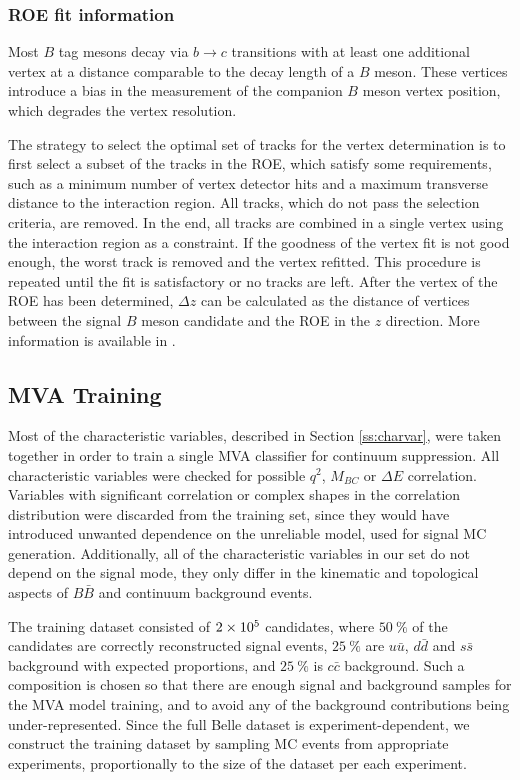 \subsubsection{ROE fit information}

Most $B$ tag mesons decay via $b \to c$ transitions with at least one additional vertex at a distance comparable to the decay length of a $B$ meson. These vertices introduce a bias in the measurement of the companion $B$ meson vertex position, which degrades the vertex resolution.

The strategy to select the optimal set of tracks for the vertex determination is to first select a subset of the tracks in the ROE, which satisfy some requirements, such as a minimum number of vertex detector hits and a maximum transverse distance to the interaction region. All tracks, which do not pass the selection criteria, are removed. In the end, all tracks are combined in a single vertex using the interaction region as a constraint. If the goodness of the vertex fit is not good enough, the worst track is removed and the vertex refitted. This procedure is repeated until the fit is satisfactory or no tracks are left. After the vertex of the ROE has been determined, $\Delta z$ can be calculated as the distance of vertices between the signal $B$ meson candidate and the ROE in the $z$ direction.
More information is available in \cite{bevan2014physics}.

\subsection{MVA Training}
\label{ss:qqmva}
Most of the characteristic variables, described in Section \ref{ss:charvar}, were taken together in order to train a single MVA classifier for continuum suppression. All characteristic variables were checked for possible $q^2$, $M_{BC}$ or $\Delta E$ correlation. Variables with significant correlation or complex shapes in the correlation distribution were discarded from the training set, since they would have introduced unwanted dependence on the unreliable model, used for signal MC generation. Additionally, all of the characteristic variables in our set do not depend on the signal mode, they only differ in the kinematic and topological aspects of $B \bar B$ and continuum background events.

The training dataset consisted of $2\times 10^{5}$ candidates, where $50~\%$ of the candidates are correctly reconstructed signal events, $25~\%$ are $u \bar u$, $d \bar d$ and $s \bar s$ background with expected proportions, and $25~\%$ is $c \bar c$ background. Such a composition is chosen so that there are enough signal and background samples for the MVA model training, and to avoid any of the background contributions being under-represented. Since the full Belle dataset is experiment-dependent, we construct the training dataset by sampling MC events from appropriate experiments, proportionally to the size of the dataset per each experiment.


